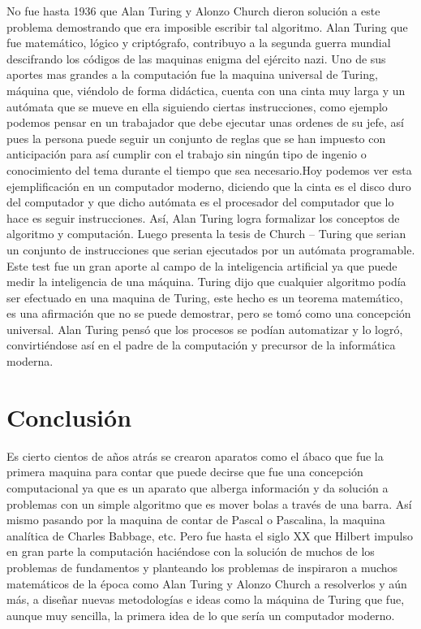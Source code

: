 \documentclass[11pt]{article}
\begin{document}
No fue hasta 1936 que Alan Turing y Alonzo Church dieron solución a este problema demostrando que era imposible escribir tal algoritmo. Alan Turing que fue matemático, lógico y criptógrafo, contribuyo a la segunda guerra mundial descifrando los códigos de las maquinas enigma del ejército nazi. Uno de sus aportes mas grandes a la computación fue la maquina universal de Turing, máquina que, viéndolo de forma didáctica, cuenta con una cinta muy larga y un autómata que se mueve en ella siguiendo ciertas instrucciones, como ejemplo podemos pensar en un trabajador que debe ejecutar unas ordenes de su jefe,  así pues la persona puede seguir un conjunto de reglas que se han impuesto con anticipación para así cumplir con el trabajo sin ningún tipo de ingenio o conocimiento del tema durante el tiempo que sea necesario.Hoy podemos ver esta ejemplificación en un computador moderno, diciendo que la cinta es el disco duro del computador y que dicho autómata es el procesador del computador que lo hace es seguir instrucciones. Así, Alan Turing logra formalizar los conceptos de algoritmo y computación. Luego presenta la tesis de Church – Turing que serian un conjunto de instrucciones que serian ejecutados por un autómata programable. Este test fue un gran aporte al campo de la inteligencia artificial ya que puede medir la inteligencia de una máquina. Turing dijo que cualquier algoritmo podía ser efectuado en una maquina de Turing, este hecho es un teorema matemático, es una afirmación que no se puede demostrar, pero se tomó como una concepción universal. Alan Turing pensó que los procesos se podían automatizar y lo logró, convirtiéndose así en el padre de la computación y precursor de la informática moderna.

\citet{turing}

\section{Conclusión}

Es cierto cientos de años atrás se crearon aparatos como el ábaco que fue la primera maquina para contar que puede decirse que fue una concepción computacional ya que es un aparato que alberga información y da solución a problemas con un simple algoritmo que es mover bolas a través de una barra. Así mismo pasando por la maquina de contar de Pascal o Pascalina, la maquina analítica de Charles Babbage, etc. Pero fue hasta el siglo XX que Hilbert impulso en gran parte la computación haciéndose con la solución de muchos de los problemas de fundamentos y planteando los problemas de inspiraron a muchos matemáticos de la época como Alan Turing y Alonzo Church a resolverlos y aún más, a diseñar nuevas metodologías e ideas como la máquina de Turing que fue, aunque muy sencilla, la primera idea de lo que sería un computador moderno.

\medskip

 
\end{document}
